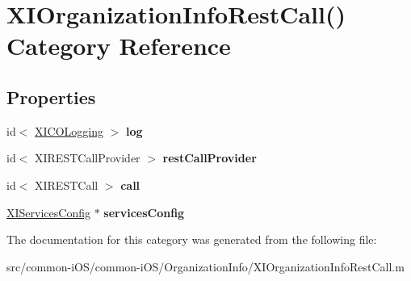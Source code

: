 \hypertarget{category_x_i_organization_info_rest_call_07_08}{}\section{X\+I\+Organization\+Info\+Rest\+Call() Category Reference}
\label{category_x_i_organization_info_rest_call_07_08}
\subsection*{Properties}
\begin{DoxyCompactItemize}
\item 
\hypertarget{category_x_i_organization_info_rest_call_07_08_a74d1d7dbc968f93589cdb7235995a2e8}{}\label{category_x_i_organization_info_rest_call_07_08_a74d1d7dbc968f93589cdb7235995a2e8} 
id$<$ \hyperlink{protocol_x_i_c_o_logging-p}{X\+I\+C\+O\+Logging} $>$ {\bfseries log}
\item 
\hypertarget{category_x_i_organization_info_rest_call_07_08_a38773628bd27b1bc0a1cb2b3f641a436}{}\label{category_x_i_organization_info_rest_call_07_08_a38773628bd27b1bc0a1cb2b3f641a436} 
id$<$ X\+I\+R\+E\+S\+T\+Call\+Provider $>$ {\bfseries rest\+Call\+Provider}
\item 
\hypertarget{category_x_i_organization_info_rest_call_07_08_a42cbb3a8d48464d168bae7edffbc0a25}{}\label{category_x_i_organization_info_rest_call_07_08_a42cbb3a8d48464d168bae7edffbc0a25} 
id$<$ X\+I\+R\+E\+S\+T\+Call $>$ {\bfseries call}
\item 
\hypertarget{category_x_i_organization_info_rest_call_07_08_ad810f2a4ffd177d8abfa0ab25cd80345}{}\label{category_x_i_organization_info_rest_call_07_08_ad810f2a4ffd177d8abfa0ab25cd80345} 
\hyperlink{interface_x_i_services_config}{X\+I\+Services\+Config} $\ast$ {\bfseries services\+Config}
\end{DoxyCompactItemize}


The documentation for this category was generated from the following file\+:\begin{DoxyCompactItemize}
\item 
src/common-\/i\+O\+S/common-\/i\+O\+S/\+Organization\+Info/X\+I\+Organization\+Info\+Rest\+Call.\+m\end{DoxyCompactItemize}
